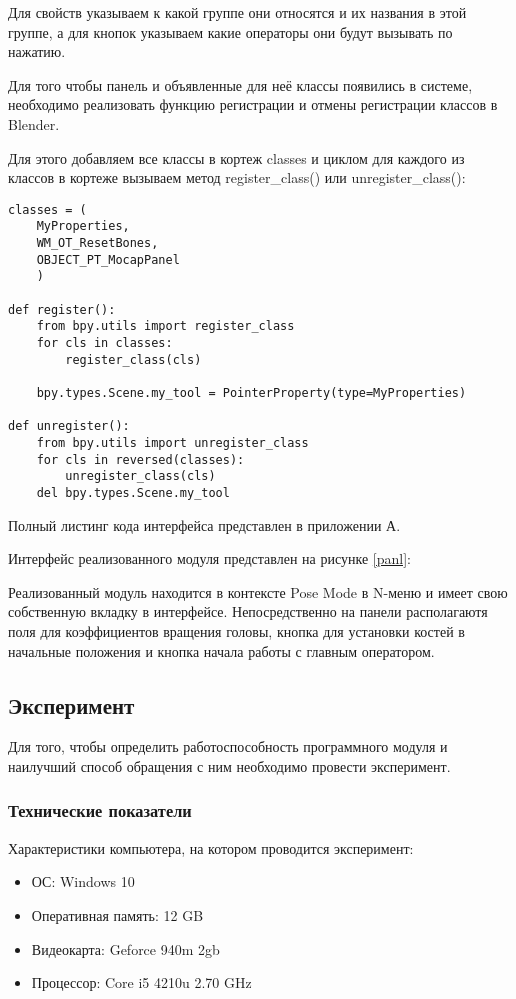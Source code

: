 Для свойств указываем к какой группе они относятся и их названия в этой группе, а для кнопок указываем какие операторы они будут вызывать по нажатию.

Для того чтобы панель и объявленные для неё классы появились в системе, необходимо реализовать функцию регистрации и отмены регистрации классов в Blender.

Для этого добавляем все классы в кортеж classes и циклом для каждого из классов в кортеже вызываем метод register\_class() или unregister\_class():
\begin{lstlisting}
classes = (
	MyProperties,
	WM_OT_ResetBones,
	OBJECT_PT_MocapPanel
	)

def register():
	from bpy.utils import register_class
	for cls in classes:
		register_class(cls)

	bpy.types.Scene.my_tool = PointerProperty(type=MyProperties)

def unregister():
	from bpy.utils import unregister_class
	for cls in reversed(classes):
		unregister_class(cls)
	del bpy.types.Scene.my_tool
\end{lstlisting}

Полный листинг кода интерфейса представлен в приложении А.

Интерфейс реализованного модуля представлен на рисунке \ref{panl}:  

Реализованный модуль находится в контексте Pose Mode в N-меню и имеет свою собственную вкладку в интерфейсе. Непосредственно на панели располагаютя поля для коэффициентов вращения головы, кнопка для установки костей в начальные положения и кнопка начала работы с главным оператором.

\subsection {Эксперимент}

Для того, чтобы определить работоспособность программного модуля и наилучший способ обращения с ним необходимо провести эксперимент.

\subsubsection {Технические показатели}

Характеристики компьютера, на котором проводится эксперимент:
\begin{itemize}
	\item ОС: Windows 10
	\item Оперативная память: 12 GB
	\item Видеокарта: Geforce 940m 2gb
	\item Процессор: Core i5 4210u 2.70 GHz
\end{itemize}


